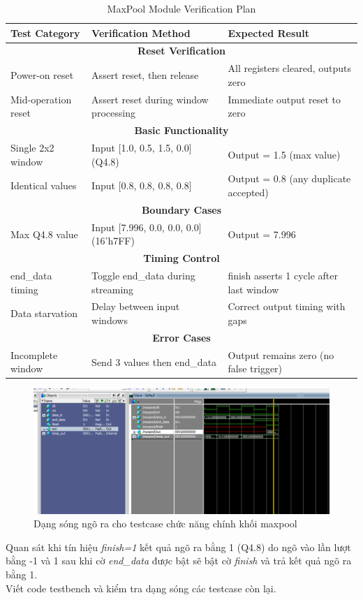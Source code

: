 \begin{table}[h]
\centering
\caption{MaxPool Module Verification Plan}
\label{tab:maxpool_verification}
\begin{tabular}{|l|l|l|}
\hline
\textbf{Test Category} & \textbf{Verification Method} & \textbf{Expected Result} \\ \hline
\multicolumn{3}{|c|}{\textbf{Reset Verification}} \\ \hline
Power-on reset & Assert reset, then release & All registers cleared, outputs zero \\ \hline
Mid-operation reset & Assert reset during window processing & Immediate output reset to zero \\ \hline
\multicolumn{3}{|c|}{\textbf{Basic Functionality}} \\ \hline
Single 2x2 window & Input [1.0, 0.5, 1.5, 0.0] (Q4.8) & Output = 1.5 (max value) \\ \hline

Identical values & Input [0.8, 0.8, 0.8, 0.8] & Output = 0.8 (any duplicate accepted) \\ \hline
\multicolumn{3}{|c|}{\textbf{Boundary Cases}} \\ \hline
Max Q4.8 value & Input [7.996, 0.0, 0.0, 0.0] (16'h7FF) & Output = 7.996 \\ \hline

\multicolumn{3}{|c|}{\textbf{Timing Control}} \\ \hline
end\_data timing & Toggle end\_data during streaming & finish asserts 1 cycle after last window \\ \hline
Data starvation & Delay between input windows & Correct output timing with gaps \\ \hline
\multicolumn{3}{|c|}{\textbf{Error Cases}} \\ \hline
Incomplete window & Send 3 values then end\_data & Output remains zero (no false trigger) \\ \hline
\end{tabular}
\end{table}


\begin{figure}[H]
    \centering
    \includegraphics[width=0.9\linewidth]{Images/tbmp.png}
    \caption{Dạng sóng ngõ ra cho testcase chức năng chính khối maxpool}
    \label{fig:enter-label}
\end{figure}
Quan sát khi tín hiệu \textit{finish=1} kết quả ngõ ra bằng 1 (Q4.8) do ngõ vào lần lượt bằng -1 và 1 sau khi cờ \textit{end\_data} được bật sẽ bật cờ \textit{finish} và trả kết quả ngõ ra bằng 1. \\
Viết code testbench và kiểm tra dạng sóng các testcase còn lại.


